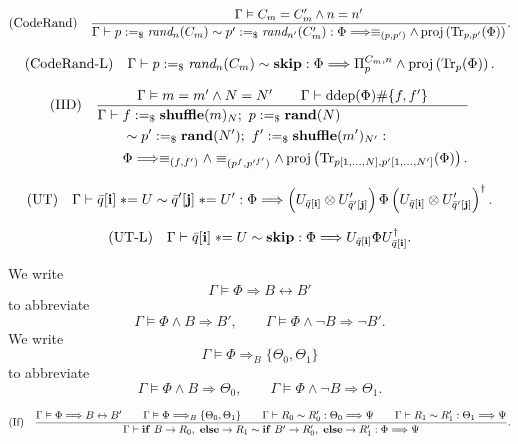 \documentclass[acmsmall,screen,review,anonymous,nonacm]{acmart}
\theoremstyle{defn_style}
\newcommand{\asteq}{\mathrel{*}=}
\begin{document}
\[
\text{\rm (CodeRand)}
\quad
\frac{
\Gamma
\vDash
C_m=C_m'\land n=n'
}{
\Gamma
\vdash
p :=_{\$}\textit{rand}_{n}(C_m)
\sim
p':=_{\$}\textit{rand}_{n'}(C_m')
:
\Phi
\Longrightarrow
\equiv_{(p,p')}
\land
\operatorname{proj}
\left(
\operatorname{Tr}_{p,p'}(\Phi)
\right)
}.
\]

\[
\text{\rm (CodeRand-L)}
\quad
\Gamma
\vdash
p :=_{\$}\textit{rand}_{n}(C_m)
\sim
\mathbf{skip}
:
\Phi
\Longrightarrow
\Pi_{p}^{C_m,n}
\land
\operatorname{proj}
\left(
\operatorname{Tr}_{p}(\Phi)
\right).
\]

\[
\text{\rm (IID)}
\quad
\frac{
\Gamma\vDash m=m'\land N=N'
\qquad
\Gamma\vdash
\operatorname{ddep}(\Phi)\#\{f,f'\}
}{
\begin{aligned}
\Gamma
\vdash\;&
f:=_{\$}\mathbf{shuffle}(m)_N;\
p:=_{\$}\mathbf{rand}(N)
\\
&\sim
p':=_{\$}\mathbf{rand}(N');\
f':=_{\$}\mathbf{shuffle}(m')_{N'}:
\\
&
\Phi
\Longrightarrow
\equiv_{(f,f')}
\land
\equiv_{(p^f,p'^{f'})}
\land
\operatorname{proj}
\left(
\operatorname{Tr}_{p[1,\ldots,N],p'[1,\ldots,N']}(\Phi)
\right).
\end{aligned}
}
\]



\[
\text{\rm (UT)}
\quad
\Gamma
\vdash
\bar q[\mathbf i]\asteq U
\sim
\bar q'[\mathbf j]\asteq U'
:
\Phi
\Longrightarrow
\left(
U_{\bar q[\mathbf i]}
\otimes
U'_{\bar q'[\mathbf j]}
\right)
\Phi
\left(
U_{\bar q[\mathbf i]}
\otimes
U'_{\bar q'[\mathbf j]}
\right)^{\dagger}.
\]

\[
\text{\rm (UT-L)}
\quad
\Gamma
\vdash
\bar q[\mathbf i]\asteq U
\sim
\mathbf{skip}
:
\Phi
\Longrightarrow
U_{\bar q[\mathbf i]}
\Phi
U_{\bar q[\mathbf i]}^\dagger .
\]

We write
\[
\Gamma
\vDash
\Phi\Longrightarrow B\leftrightarrow B'
\]
to abbreviate
\[
\Gamma\vDash \Phi\land B\Longrightarrow B',
\qquad
\Gamma\vDash \Phi\land\neg B\Longrightarrow \neg B'.
\]
We write
\[
\Gamma
\vDash
\Phi\Longrightarrow_B\{\Theta_0,\Theta_1\}
\]
to abbreviate
\[
\Gamma\vDash \Phi\land B\Longrightarrow\Theta_0,
\qquad
\Gamma\vDash \Phi\land\neg B\Longrightarrow\Theta_1.
\]

\[
\text{\rm (If)}
\quad
\frac{
\Gamma
\vDash
\Phi\Longrightarrow B\leftrightarrow B'
\qquad
\Gamma
\vDash
\Phi\Longrightarrow_B\{\Theta_0,\Theta_1\}
\qquad
\Gamma
\vdash
R_0\sim R'_0:
\Theta_0\Longrightarrow\Psi
\qquad
\Gamma
\vdash
R_1\sim R'_1:
\Theta_1\Longrightarrow\Psi
}{
\Gamma
\vdash
\mathbf{if}\ B\rightarrow R_0,\ \mathbf{else}\rightarrow R_1
\sim
\mathbf{if}\ B'\rightarrow R'_0,\ \mathbf{else}\rightarrow R'_1
:
\Phi
\Longrightarrow
\Psi
}.
\]
\end{document}
